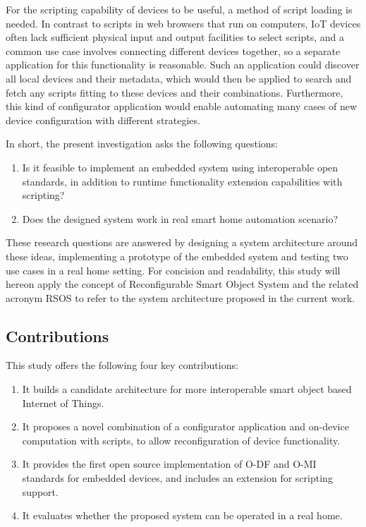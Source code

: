 For the scripting capability of devices to be useful, a method of script loading is needed. In contrast to scripts in web browsers that run on computers, IoT devices often lack sufficient physical input and output facilities to select scripts, and a common use case involves connecting different devices together, so a separate application for this functionality is reasonable. Such an application could discover all local devices and their metadata, which would then be applied to search and fetch any scripts fitting to these devices and their combinations. Furthermore, this kind of configurator application would enable automating many cases of new device configuration with different strategies.


In short, the present investigation asks the following questions: %
\begin{enumerate}
  \item Is it feasible to implement an embedded system using interoperable open standards, in addition to runtime functionality extension capabilities with scripting?
  \item Does the designed system work in real smart home automation scenario?
\end{enumerate}
These research questions are answered by designing a system architecture around these ideas, implementing a prototype of the embedded system and testing 
two use cases in a real home setting. For concision and readability, this study will hereon apply the concept of Reconfigurable Smart Object System and the related acronym RSOS to refer to the system architecture proposed in the current work.


\subsection*{Contributions}

This study offers the following four key contributions:

\begin{enumerate}
  \item It builds a candidate architecture for more interoperable smart object based Internet of Things.
  \item It proposes a novel combination of a configurator application and on-device computation with scripts, to allow reconfiguration of device functionality.
  \item It provides the first open source implementation of O-DF and O-MI standards for embedded devices, and includes an extension for scripting support.
  \item It evaluates whether the proposed system can be operated in a real home.
\end{enumerate}





